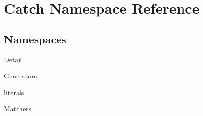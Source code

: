 \hypertarget{namespace_catch}{}\section{Catch Namespace Reference}
\label{namespace_catch}
\subsection*{Namespaces}
\begin{DoxyCompactItemize}
\item 
 \mbox{\hyperlink{namespace_catch_1_1_detail}{Detail}}
\item 
 \mbox{\hyperlink{namespace_catch_1_1_generators}{Generators}}
\item 
 \mbox{\hyperlink{namespace_catch_1_1literals}{literals}}
\item 
 \mbox{\hyperlink{namespace_catch_1_1_matchers}{Matchers}}
\end{DoxyCompactItemize}
